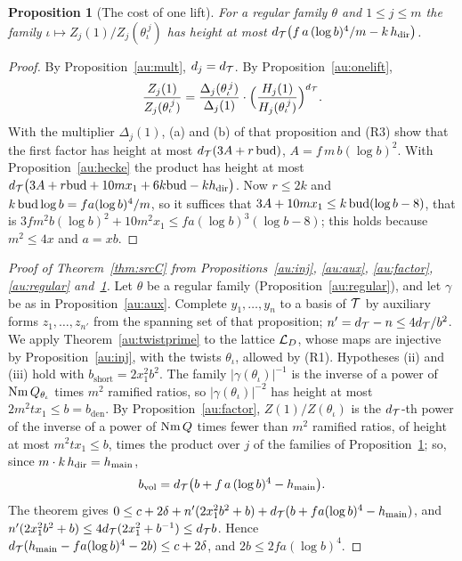 \documentclass[10pt]{amsart}
\newtheorem{proposition}[theorem]{Proposition}
\theoremstyle{definition}
\theoremstyle{remark}
\begin{document}
\begin{proposition}[The cost of one lift]\label{au:Zj}
For a regular family $\theta$ and $1\le j\le m$ the family $\iota\mapsto Z_j(1)/Z_j(\theta_\iota^
{\,j})$ has height at most $d_{\mathcal T}\bigl(f\,a\,(\log b)^4/m-k\,h_{\mathrm{dir}}\bigr)$.
\end{proposition}
\begin{proof}
By Proposition~\ref{au:mult}, $d_j=d_{\mathcal T}$. By Proposition~\ref{au:onelift},
\[
\frac{Z_j(1)}{Z_j(\theta_\iota^{\,j})}=\frac{\Delta_j(\theta_\iota^{\,j})}{\Delta_j(1)}\cdot
\Bigl(\frac{H_j(1)}{H_j(\theta_\iota^{\,j})}\Bigr)^{d_{\mathcal T}} .
\]
With the multiplier $\Delta_j(1)$, (a) and (b) of that proposition and (R3) show that the first
factor has height at most $d_{\mathcal T}(3A+r\,\mathrm{bud})$, $A=f\,m\,b(\log b)^2$. With
Proposition~\ref{au:hecke} the product has height at most
$d_{\mathcal T}\bigl(3A+r\mathrm{bud}+10mx_1+6k\mathrm{bud}-kh_{\mathrm{dir}}\bigr)$. Now $r\le2k$ and
$k\,\mathrm{bud}\log b=fa(\log b)^4/m$, so it suffices that $3A+10mx_1\le k\,\mathrm{bud}(\log b-8)$, that
is $3fm^2b(\log b)^2+10m^2x_1\le fa(\log b)^3(\log b-8)$; this holds because $m^2\le4x$ and
$a=xb$.
\end{proof}

\begin{proof}[Proof of Theorem~\ref{thm:srcC} from Propositions~\ref{au:inj}, \ref{au:aux},
\ref{au:factor}, \ref{au:regular} and~\ref{au:Zj}]
Let $\theta$ be a regular family (Proposition~\ref{au:regular}), and let $\gamma$ be as in
Proposition~\ref{au:aux}. Complete $y_1,\dots,y_n$ to a basis of $\mathcal T$ by auxiliary forms
$z_1,\dots,z_{n'}$ from the spanning set of that proposition; $n'=d_{\mathcal T}-n\le4d_{\mathcal T}/b^2$. We apply
Theorem~\ref{au:twistprime} to the lattice $\mathcal L_D$, whose maps are injective by
Proposition~\ref{au:inj}, with the twists $\theta_\iota$, allowed by (R1). Hypotheses (ii) and
(iii) hold with $b_{\mathrm{short}}=2x_1^2b^2$. The family $|\gamma(\theta_\iota)|^{-1}$ is the
inverse of a power of $\operatorname{Nm} Q_{\theta_\iota}$ times $m^2$ ramified ratios, so
$|\gamma(\theta_\iota)|^{-2}$ has height at most $2m^2tx_1\le b=b_{\mathrm{den}}$. By
Proposition~\ref{au:factor}, $Z(1)/Z(\theta_\iota)$ is the $d_{\mathcal T}$-th power of the inverse of a
power of $\operatorname{Nm} Q$ times fewer than $m^2$ ramified ratios, of height at most $m^2tx_1\le b$,
times the product over $j$ of the families of Proposition~\ref{au:Zj}; so, since
$m\cdot k\,h_{\mathrm{dir}}=h_{\mathrm{main}}$,
\[
b_{\mathrm{vol}}=d_{\mathcal T}\bigl(b+f\,a\,(\log b)^4-h_{\mathrm{main}}\bigr).
\]
The theorem gives $0\le c+2\delta+n'(2x_1^2b^2+b)+d_{\mathcal T}(b+fa(\log b)^4-h_{\mathrm{main}})$, and
$n'(2x_1^2b^2+b)\le4d_{\mathcal T}(2x_1^2+b^{-1})\le d_{\mathcal T} b$. Hence
$d_{\mathcal T}(h_{\mathrm{main}}-fa(\log b)^4-2b)\le c+2\delta$, and $2b\le2fa(\log b)^4$.
\end{proof}
\end{document}
